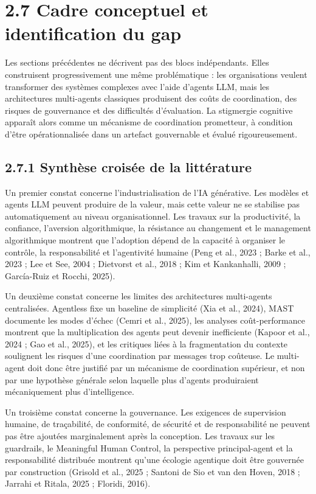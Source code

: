 \section{2.7 Cadre conceptuel et identification du gap}\label{cadre-conceptuel-et-identification-du-gap}

Les sections précédentes ne décrivent pas des blocs indépendants. Elles construisent progressivement une même problématique : les organisations veulent transformer des systèmes complexes avec l'aide d'agents LLM, mais les architectures multi-agents classiques produisent des coûts de coordination, des risques de gouvernance et des difficultés d'évaluation. La stigmergie cognitive apparaît alors comme un mécanisme de coordination prometteur, à condition d'être opérationnalisée dans un artefact gouvernable et évalué rigoureusement.

\subsection{2.7.1 Synthèse croisée de la littérature}\label{synthuxe8se-croisuxe9e-de-la-littuxe9rature}

Un premier constat concerne l'industrialisation de l'IA générative. Les modèles et agents LLM peuvent produire de la valeur, mais cette valeur ne se stabilise pas automatiquement au niveau organisationnel. Les travaux sur la productivité, la confiance, l'aversion algorithmique, la résistance au changement et le management algorithmique montrent que l'adoption dépend de la capacité à organiser le contrôle, la responsabilité et l'agentivité humaine (Peng et al., 2023 ; Barke et al., 2023 ; Lee et See, 2004 ; Dietvorst et al., 2018 ; Kim et Kankanhalli, 2009 ; García-Ruiz et Rocchi, 2025).

Un deuxième constat concerne les limites des architectures multi-agents centralisées. Agentless fixe un baseline de simplicité (Xia et al., 2024), MAST documente les modes d'échec (Cemri et al., 2025), les analyses coût-performance montrent que la multiplication des agents peut devenir inefficiente (Kapoor et al., 2024 ; Gao et al., 2025), et les critiques liées à la fragmentation du contexte soulignent les risques d'une coordination par messages trop coûteuse. Le multi-agent doit donc être justifié par un mécanisme de coordination supérieur, et non par une hypothèse générale selon laquelle plus d'agents produiraient mécaniquement plus d'intelligence.

Un troisième constat concerne la gouvernance. Les exigences de supervision humaine, de traçabilité, de conformité, de sécurité et de responsabilité ne peuvent pas être ajoutées marginalement après la conception. Les travaux sur les guardrails, le Meaningful Human Control, la perspective principal-agent et la responsabilité distribuée montrent qu'une écologie agentique doit être gouvernée par construction (Grisold et al., 2025 ; Santoni de Sio et van den Hoven, 2018 ; Jarrahi et Ritala, 2025 ; Floridi, 2016).


